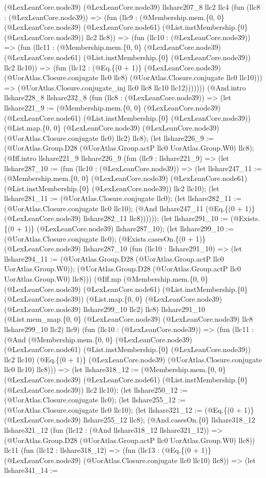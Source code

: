 \documentclass[11pt]{article}
\begin{document}
(@LexLeanCore.node39) (@LexLeanCore.node39) llshare207\_8 llc2 llc4 (fun (llc8 : (@LexLeanCore.node39)) => (fun (llc9 : (@Membership.mem.\{0, 0\} (@LexLeanCore.node39) (@LexLeanCore.node61) (@List.instMembership.\{0\} (@LexLeanCore.node39)) llc2 llc8)) => (fun (llc10 : (@LexLeanCore.node39)) => (fun (llc11 : (@Membership.mem.\{0, 0\} (@LexLeanCore.node39) (@LexLeanCore.node61) (@List.instMembership.\{0\} (@LexLeanCore.node39)) llc2 llc10)) => (fun (llc12 : (@Eq.\{(0 + 1)\} (@LexLeanCore.node39) (@UorAtlas.Closure.conjugate llc0 llc8) (@UorAtlas.Closure.conjugate llc0 llc10))) => (@UorAtlas.Closure.conjugate\_inj llc0 llc8 llc10 llc12))))))) (@And.intro llshare228\_8 llshare232\_8 (fun (llc8 : (@LexLeanCore.node39)) => (let llshare221\_9 := (@Membership.mem.\{0, 0\} (@LexLeanCore.node39) (@LexLeanCore.node61) (@List.instMembership.\{0\} (@LexLeanCore.node39)) (@List.map.\{0, 0\} (@LexLeanCore.node39) (@LexLeanCore.node39) (@UorAtlas.Closure.conjugate llc0) llc2) llc8); (let llshare226\_9 := (@UorAtlas.Group.D28 (@UorAtlas.Group.actP llc0 UorAtlas.Group.W0) llc8); (@Iff.intro llshare221\_9 llshare226\_9 (fun (llc9 : llshare221\_9) => (let llshare287\_10 := (fun (llc10 : (@LexLeanCore.node39)) => (let llshare247\_11 := (@Membership.mem.\{0, 0\} (@LexLeanCore.node39) (@LexLeanCore.node61) (@List.instMembership.\{0\} (@LexLeanCore.node39)) llc2 llc10); (let llshare281\_11 := (@UorAtlas.Closure.conjugate llc0); (let llshare282\_11 := (@UorAtlas.Closure.conjugate llc0 llc10); (@And llshare247\_11 (@Eq.\{(0 + 1)\} (@LexLeanCore.node39) llshare282\_11 llc8)))))); (let llshare291\_10 := (@Exists.\{(0 + 1)\} (@LexLeanCore.node39) llshare287\_10); (let llshare299\_10 := (@UorAtlas.Closure.conjugate llc0); (@Exists.casesOn.\{(0 + 1)\} (@LexLeanCore.node39) llshare287\_10 (fun (llc10 : llshare291\_10) => (let llshare294\_11 := (@UorAtlas.Group.D28 (@UorAtlas.Group.actP llc0 UorAtlas.Group.W0)); (@UorAtlas.Group.D28 (@UorAtlas.Group.actP llc0 UorAtlas.Group.W0) llc8))) (@Iff.mp (@Membership.mem.\{0, 0\} (@LexLeanCore.node39) (@LexLeanCore.node61) (@List.instMembership.\{0\} (@LexLeanCore.node39)) (@List.map.\{0, 0\} (@LexLeanCore.node39) (@LexLeanCore.node39) llshare299\_10 llc2) llc8) llshare291\_10 (@List.mem\_map.\{0, 0\} (@LexLeanCore.node39) (@LexLeanCore.node39) llc8 llshare299\_10 llc2) llc9) (fun (llc10 : (@LexLeanCore.node39)) => (fun (llc11 : (@And (@Membership.mem.\{0, 0\} (@LexLeanCore.node39) (@LexLeanCore.node61) (@List.instMembership.\{0\} (@LexLeanCore.node39)) llc2 llc10) (@Eq.\{(0 + 1)\} (@LexLeanCore.node39) (@UorAtlas.Closure.conjugate llc0 llc10) llc8))) => (let llshare318\_12 := (@Membership.mem.\{0, 0\} (@LexLeanCore.node39) (@LexLeanCore.node61) (@List.instMembership.\{0\} (@LexLeanCore.node39)) llc2 llc10); (let llshare250\_12 := (@UorAtlas.Closure.conjugate llc0); (let llshare255\_12 := (@UorAtlas.Closure.conjugate llc0 llc10); (let llshare321\_12 := (@Eq.\{(0 + 1)\} (@LexLeanCore.node39) llshare255\_12 llc8); (@And.casesOn.\{0\} llshare318\_12 llshare321\_12 (fun (llc12 : (@And llshare318\_12 llshare321\_12)) => (@UorAtlas.Group.D28 (@UorAtlas.Group.actP llc0 UorAtlas.Group.W0) llc8)) llc11 (fun (llc12 : llshare318\_12) => (fun (llc13 : (@Eq.\{(0 + 1)\} (@LexLeanCore.node39) (@UorAtlas.Closure.conjugate llc0 llc10) llc8)) => (let llshare341\_14 := 
\end{document}
